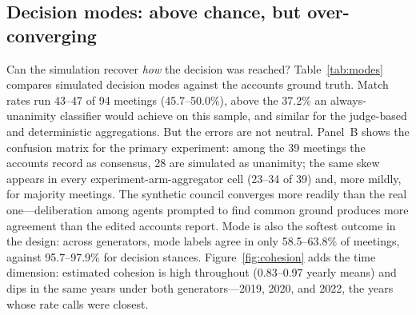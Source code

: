 \documentclass[11pt,a4paper]{article}
\begin{document}
\subsection{Decision modes: above chance, but over-converging}\label{sec:modes}

Can the simulation recover \emph{how} the decision was reached? Table~\ref{tab:modes} compares simulated decision modes against the accounts ground truth. Match rates run 43--47 of 94 meetings (45.7--50.0\%), above the 37.2\% an always-unanimity classifier would achieve on this sample, and similar for the judge-based and deterministic aggregations. But the errors are not neutral. Panel~B shows the confusion matrix for the primary experiment: among the 39 meetings the accounts record as consensus, 28 are simulated as unanimity; the same skew appears in every experiment-arm-aggregator cell (23--34 of 39) and, more mildly, for majority meetings. The synthetic council converges more readily than the real one---deliberation among agents prompted to find common ground produces more agreement than the edited accounts report. Mode is also the softest outcome in the design: across generators, mode labels agree in only 58.5--63.8\% of meetings, against 95.7--97.9\% for decision stances. Figure~\ref{fig:cohesion} adds the time dimension: estimated cohesion is high throughout (0.83--0.97 yearly means) and dips in the same years under both generators---2019, 2020, and 2022, the years whose rate calls were closest.
\end{document}
